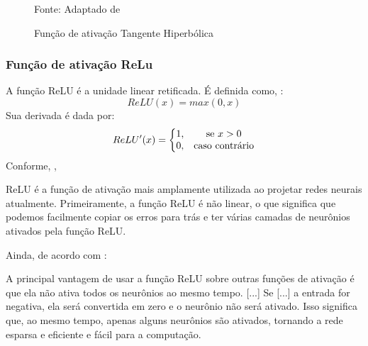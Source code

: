 \begin{figure}[h!]
	\centering
	\caption{Função de ativação Tangente Hiperbólica}
	
	{\scriptsize 	Fonte: Adaptado de }
	\label{fig:tanh}
\end{figure}

\subsubsection{Função de ativação ReLu}
A função ReLU é a unidade linear retificada. É definida como, :
\begin{equation}\label{relu}
	ReLU(x) = max(0,x)
\end{equation}
Sua derivada é dada por:
\begin{equation}\label{derivada_relu}
	ReLU'(x) = \left \{ \begin{matrix} 1, & \mbox{se }x > 0 \\ 
	0, & \mbox{\textrm{caso contrário}} \end{matrix} \right.
\end{equation}
Conforme, ,
\begin{citacao}
	 ReLU é a função de ativação mais amplamente utilizada ao projetar redes neurais atualmente. Primeiramente, a função ReLU é não linear, o que significa que podemos facilmente copiar os erros para trás e ter várias camadas de neurônios ativados pela função ReLU.
\end{citacao}
Ainda, de acordo com : 
\begin{citacao}
	A principal vantagem de usar a função ReLU sobre outras funções de ativação é que ela não ativa todos os neurônios ao mesmo tempo. [...] Se [...] a entrada for negativa, ela será convertida em zero e o neurônio não será ativado. Isso significa que, ao mesmo tempo, apenas alguns neurônios são ativados, tornando a rede esparsa e eficiente e fácil para a computação.
\end{citacao}

